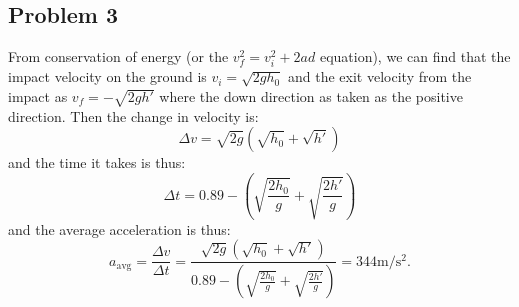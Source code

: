 \documentclass{article}
\begin{document}
\subsection*{Problem 3}
From conservation of energy (or the $v_f^2=v_i^2+2ad$ equation), we can find that the impact velocity on the ground is $v_i=\sqrt{2gh_0}$ and the exit velocity from the impact as $v_f=-\sqrt{2gh'}$ where the down direction as taken as the positive direction. Then the change in velocity is:
\begin{equation}
    \Delta v = \sqrt{2g}\left(\sqrt{h_0}+\sqrt{h'}\right)
    \label{eq:}
\end{equation}
and the time it takes is thus:
\begin{equation}
    \Delta t = 0.89-\left(\sqrt{\frac{2h_0}{g}}+\sqrt{\frac{2h'}{g}}\right)
    \label{eq:}
\end{equation}
and the average acceleration is thus:
\begin{equation}
    a_\text{avg} = \frac{\Delta v}{\Delta t} = \frac{\sqrt{2g}\left(\sqrt{h_0}+\sqrt{h'}\right)}{0.89-\left(\sqrt{\frac{2h_0}{g}}+\sqrt{\frac{2h'}{g}}\right)} = 344\si{\meter\per\second\squared}.
    \label{eq:}
\end{equation}
\end{document}

